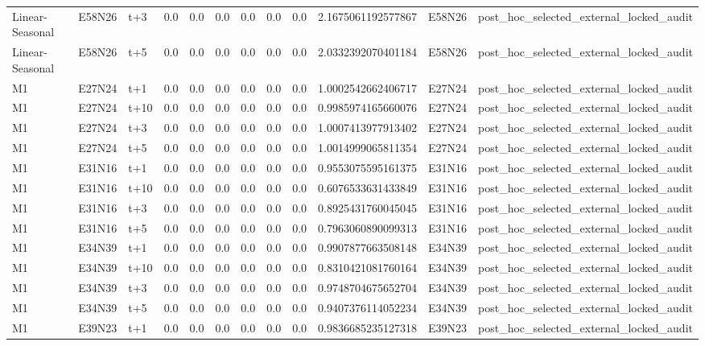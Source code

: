 \begin{landscape}
\begin{longtable}{llllllllllll}
Linear-Seasonal & E58N26 & t+3 & 0.0 & 0.0 & 0.0 & 0.0 & 0.0 & 0.0 & 2.1675061192577867 & E58N26 & post\_hoc\_selected\_external\_locked\_audit \\
Linear-Seasonal & E58N26 & t+5 & 0.0 & 0.0 & 0.0 & 0.0 & 0.0 & 0.0 & 2.0332392070401184 & E58N26 & post\_hoc\_selected\_external\_locked\_audit \\
M1 & E27N24 & t+1 & 0.0 & 0.0 & 0.0 & 0.0 & 0.0 & 0.0 & 1.0002542662406717 & E27N24 & post\_hoc\_selected\_external\_locked\_audit \\
M1 & E27N24 & t+10 & 0.0 & 0.0 & 0.0 & 0.0 & 0.0 & 0.0 & 0.9985974165660076 & E27N24 & post\_hoc\_selected\_external\_locked\_audit \\
M1 & E27N24 & t+3 & 0.0 & 0.0 & 0.0 & 0.0 & 0.0 & 0.0 & 1.0007413977913402 & E27N24 & post\_hoc\_selected\_external\_locked\_audit \\
M1 & E27N24 & t+5 & 0.0 & 0.0 & 0.0 & 0.0 & 0.0 & 0.0 & 1.0014999065811354 & E27N24 & post\_hoc\_selected\_external\_locked\_audit \\
M1 & E31N16 & t+1 & 0.0 & 0.0 & 0.0 & 0.0 & 0.0 & 0.0 & 0.9553075595161375 & E31N16 & post\_hoc\_selected\_external\_locked\_audit \\
M1 & E31N16 & t+10 & 0.0 & 0.0 & 0.0 & 0.0 & 0.0 & 0.0 & 0.6076533631433849 & E31N16 & post\_hoc\_selected\_external\_locked\_audit \\
M1 & E31N16 & t+3 & 0.0 & 0.0 & 0.0 & 0.0 & 0.0 & 0.0 & 0.8925431760045045 & E31N16 & post\_hoc\_selected\_external\_locked\_audit \\
M1 & E31N16 & t+5 & 0.0 & 0.0 & 0.0 & 0.0 & 0.0 & 0.0 & 0.7963060890099313 & E31N16 & post\_hoc\_selected\_external\_locked\_audit \\
M1 & E34N39 & t+1 & 0.0 & 0.0 & 0.0 & 0.0 & 0.0 & 0.0 & 0.9907877663508148 & E34N39 & post\_hoc\_selected\_external\_locked\_audit \\
M1 & E34N39 & t+10 & 0.0 & 0.0 & 0.0 & 0.0 & 0.0 & 0.0 & 0.8310421081760164 & E34N39 & post\_hoc\_selected\_external\_locked\_audit \\
M1 & E34N39 & t+3 & 0.0 & 0.0 & 0.0 & 0.0 & 0.0 & 0.0 & 0.9748704675652704 & E34N39 & post\_hoc\_selected\_external\_locked\_audit \\
M1 & E34N39 & t+5 & 0.0 & 0.0 & 0.0 & 0.0 & 0.0 & 0.0 & 0.9407376114052234 & E34N39 & post\_hoc\_selected\_external\_locked\_audit \\
M1 & E39N23 & t+1 & 0.0 & 0.0 & 0.0 & 0.0 & 0.0 & 0.0 & 0.9836685235127318 & E39N23 & post\_hoc\_selected\_external\_locked\_audit \\

\end{longtable}
\end{landscape}
